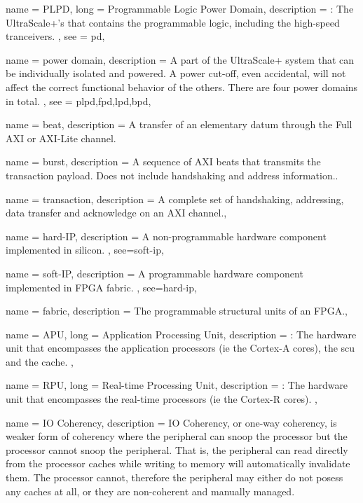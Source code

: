 {
	name = {PLPD},
	long = {Programmable Logic Power Domain},
	description = {\emph{}:
		The UltraScale+'s  that contains the
		programmable logic, including
		the high-speed tranceivers.
	},
	see = {pd},
}


{
	name = {power domain},
	description = {
		A part of the UltraScale+ system that 
		can be individually isolated and powered.
		A power cut-off, even accidental,
		will not affect the correct functional behavior
		of the others.
		There are four power domains in total.
	},
	see = {plpd,fpd,lpd,bpd},
}

{
	name = {beat},
	description = {A transfer of an elementary datum through the Full AXI or AXI-Lite channel.}
}

{
	name = {burst},
	description = {A sequence of AXI \Glspl{beat} that transmits the \gls{transaction} payload.
	Does not include handshaking and address information.}.
}

{
	name = {transaction},
	description = {A complete set of handshaking, addressing, data transfer and acknowledge on
	an AXI channel.},
}


{
	name = {hard-IP},
	description = {
		A non-programmable hardware component implemented in silicon.
	},
	see={soft-ip},
}

{
	name = {soft-IP},
	description = {
		A programmable hardware component implemented in FPGA \gls{fabric}.
	},
	see={hard-ip},
}

{
	name = {fabric},
	description = {The programmable structural units of an FPGA.},
}

{
	name = {APU},
	long = {Application Processing Unit},
	description = {\emph{}:
		The hardware unit that encompasses the application processors (ie the Cortex-A cores),
		the \gls{scu} and the cache.
	},
}

{
	name = {RPU},
	long = {Real-time Processing Unit},
	description = {\emph{}:
		The hardware unit that encompasses the real-time processors (ie the Cortex-R cores).
	},
}


{
	name = {IO Coherency},
	description = {
		IO Coherency, or one-way coherency, is weaker form of coherency where
		the peripheral can snoop the processor but the processor cannot snoop the peripheral.
		That is, the peripheral can read directly from the processor caches while
		writing to memory will automatically invalidate them. The processor cannot,
		therefore the peripheral may either do not posess any caches at all, or they
		are non-coherent and manually managed.
	}
}

